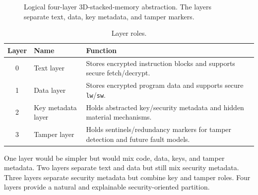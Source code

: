 \documentclass[conference]{IEEEtran}
\begin{document}
\begin{figure}[!t]
\centering
{}
\caption{Logical four-layer 3D-stacked-memory abstraction. The layers separate text, data, key metadata, and tamper markers.}
\label{fig:layers}
\end{figure}

\begin{table}[!t]
\caption{Layer roles.}
\label{tab:layers}
\centering
\scriptsize
\begin{tabularx}{\columnwidth}{@{}c L{0.23\columnwidth} Y@{}}
\toprule
Layer & Name & Function \\
 & Text layer & Stores encrypted instruction blocks and supports secure fetch/decrypt. \\
1 & Data layer & Stores encrypted program data and supports secure \texttt{lw}/\texttt{sw}. \\
2 & Key metadata layer & Holds abstracted key/security metadata and hidden material mechanisms. \\
3 & Tamper layer & Holds sentinels/redundancy markers for tamper detection and future fault models. \\
\bottomrule
\end{tabularx}
\end{table}

One layer would be simpler but would mix code, data, keys, and tamper metadata. Two layers separate text and data but still mix security metadata. Three layers separate security metadata but combine key and tamper roles. Four layers provide a natural and explainable security-oriented partition.
\end{document}
